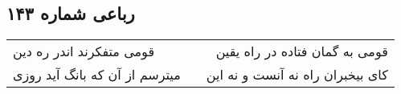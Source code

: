\begin{center}
\section*{رباعی شماره ۱۴۳}
\label{sec:sh143}
\begin{longtable}{l p{0.5cm} r}
قومی متفکرند اندر ره دین
&&
قومی به گمان فتاده در راه یقین
\\
میترسم از آن که بانگ آید روزی
&&
کای بیخبران راه نه آنست و نه این
\\
\end{longtable}
\end{center}
